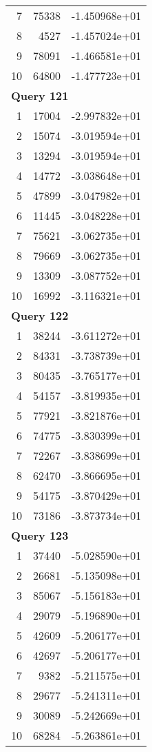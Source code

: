 \begin{longtable}[{p}]{@{}rrp{}@{}}
7 & 75338 & -1.450968e+01 \\
8 & 4527 & -1.457024e+01 \\
9 & 78091 & -1.466581e+01 \\
10 & 64800 & -1.477723e+01 \\
\midrule
\multicolumn{3}{l}{\bfseries Query 121} \\
1 & 17004 & -2.997832e+01 \\
2 & 15074 & -3.019594e+01 \\
3 & 13294 & -3.019594e+01 \\
4 & 14772 & -3.038648e+01 \\
5 & 47899 & -3.047982e+01 \\
6 & 11445 & -3.048228e+01 \\
7 & 75621 & -3.062735e+01 \\
8 & 79669 & -3.062735e+01 \\
9 & 13309 & -3.087752e+01 \\
10 & 16992 & -3.116321e+01 \\
\midrule
\multicolumn{3}{l}{\bfseries Query 122} \\
1 & 38244 & -3.611272e+01 \\
2 & 84331 & -3.738739e+01 \\
3 & 80435 & -3.765177e+01 \\
4 & 54157 & -3.819935e+01 \\
5 & 77921 & -3.821876e+01 \\
6 & 74775 & -3.830399e+01 \\
7 & 72267 & -3.838699e+01 \\
8 & 62470 & -3.866695e+01 \\
9 & 54175 & -3.870429e+01 \\
10 & 73186 & -3.873734e+01 \\
\midrule
\multicolumn{3}{l}{\bfseries Query 123} \\
1 & 37440 & -5.028590e+01 \\
2 & 26681 & -5.135098e+01 \\
3 & 85067 & -5.156183e+01 \\
4 & 29079 & -5.196890e+01 \\
5 & 42609 & -5.206177e+01 \\
6 & 42697 & -5.206177e+01 \\
7 & 9382 & -5.211575e+01 \\
8 & 29677 & -5.241311e+01 \\
9 & 30089 & -5.242669e+01 \\
10 & 68284 & -5.263861e+01 \\

\end{longtable}

